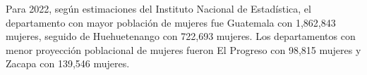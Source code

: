 \justifying Para 2022, según estimaciones del Instituto Nacional de Estadística, el departamento con mayor población de mujeres fue Guatemala con 1,862,843 mujeres, seguido de Huehuetenango con 722,693 mujeres. Los departamentos con menor proyección poblacional de mujeres fueron El Progreso con 98,815 mujeres y Zacapa con 139,546 mujeres. 
